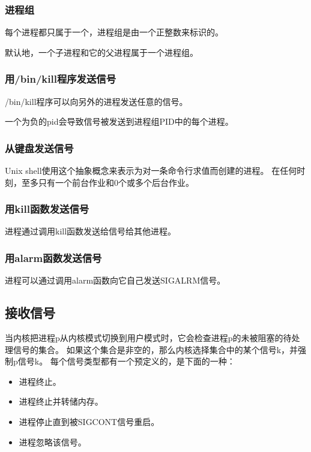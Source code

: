 {{        \subsubsection{进程组}
        {
            每个进程都只属于一个，进程组是由一个正整数来标识的。

            默认地，一个子进程和它的父进程属于一个进程组。
        }

        \subsubsection{用/bin/kill程序发送信号}
        {
            /bin/kill程序可以向另外的进程发送任意的信号。

            一个为负的pid会导致信号被发送到进程组PID中的每个进程。
        }

        \subsubsection{从键盘发送信号}
        {
            Unix shell使用这个抽象概念来表示为对一条命令行求值而创建的进程。
            在任何时刻，至多只有一个前台作业和0个或多个后台作业。
        }

        \subsubsection{用kill函数发送信号}
        {
            进程通过调用kill函数发送给信号给其他进程。
        }

        \subsubsection{用alarm函数发送信号}
        {
            进程可以通过调用alarm函数向它自己发送SIGALRM信号。
        }
    }

    \subsection{接收信号}
    {
        当内核把进程p从内核模式切换到用户模式时，它会检查进程p的未被阻塞的待处理信号的集合。
        如果这个集合是非空的，那么内核选择集合中的某个信号k，并强制p信号k。
        每个信号类型都有一个预定义的，是下面的一种：

        \begin{itemize}
            \item 进程终止。
            \item 进程终止并转储内存。
            \item 进程停止直到被SIGCONT信号重启。
            \item 进程忽略该信号。
        \end{itemize}

}}
